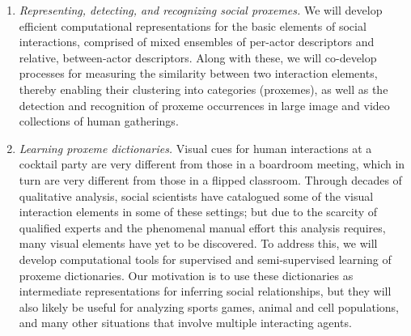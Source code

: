 \begin{enumerate}

\vspace{-0.1in}\item \emph{Representing, detecting, and recognizing social proxemes.} We will develop efficient computational representations for the basic elements of social interactions, comprised of mixed ensembles of per-actor descriptors and relative, between-actor descriptors. Along with these, we will co-develop processes for measuring the similarity between two interaction elements, thereby enabling their clustering into categories (proxemes), as well as the detection and recognition of proxeme occurrences in  large image and video collections of human gatherings. 

\vspace{-0.1in}\item \emph{Learning proxeme dictionaries.} Visual cues for human interactions at a cocktail party are very different from those in a boardroom meeting, which in turn are very different from those in a flipped classroom. Through decades of qualitative analysis, social scientists have catalogued some of the visual interaction elements in some of these settings; but due to the scarcity of qualified experts and the phenomenal manual effort this analysis requires, many visual elements have yet to be discovered. To address this, we will develop computational tools for supervised and semi-supervised learning of proxeme dictionaries. Our motivation is to use these dictionaries as intermediate representations for inferring social relationships, but they will also likely be useful for analyzing sports games, animal and cell populations, and many other situations that involve multiple interacting agents.






\end{enumerate}
